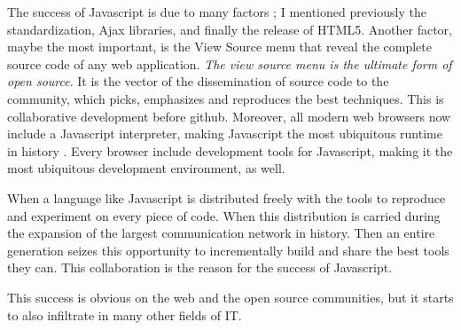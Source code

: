 

The success of Javascript is due to many factors ; I mentioned previously the standardization, Ajax libraries, and finally the release of HTML5.
Another factor, maybe the most important, is the View Source menu that reveal the complete source code of any web application.
\textit{The view source menu is the ultimate form of open source}.
It is the vector of the dissemination of source code to the community, which picks, emphasizes and reproduces the best techniques.
This is collaborative development before github.
Moreover, all modern web browsers now include a Javascript interpreter, making Javascript the most ubiquitous runtime in history \cite{Flanagan2006}.
Every browser include development tools for Javascript, making it the most ubiquitous development environment, as well.

When a language like Javascript is distributed freely with the tools to reproduce and experiment on every piece of code.
When this distribution is carried during the expansion of the largest communication network in history.
Then an entire generation seizes this opportunity to incrementally build and share the best tools they can.
This collaboration is the reason for the success of Javascript.



This success is obvious on the web and the open source communities, but it starts to also infiltrate in many other fields of IT.

